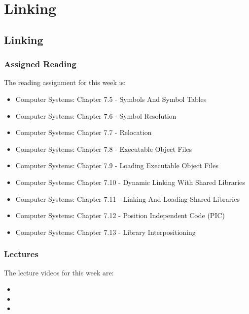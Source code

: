 \clearpage

\renewcommand{\ChapTitle}{Linking}
\renewcommand{\SectionTitle}{Linking}

\chapter{\ChapTitle}

\section{\SectionTitle}

\subsection{Assigned Reading}

The reading assignment for this week is:

\begin{itemize}
    \item Computer Systems: Chapter 7.5 - Symbols And Symbol Tables
    \item Computer Systems: Chapter 7.6 - Symbol Resolution
    \item Computer Systems: Chapter 7.7 - Relocation
    \item Computer Systems: Chapter 7.8 - Executable Object Files
    \item Computer Systems: Chapter 7.9 - Loading Executable Object Files
    \item Computer Systems: Chapter 7.10 - Dynamic Linking With Shared Libraries
    \item Computer Systems: Chapter 7.11 - Linking And Loading Shared Libraries
    \item Computer Systems: Chapter 7.12 - Position Independent Code (PIC)
    \item Computer Systems: Chapter 7.13 - Library Interpositioning
\end{itemize}

\subsection{Lectures}

The lecture videos for this week are:

\begin{itemize}
    \item {}
    \item {}
    \item {}
\end{itemize}

